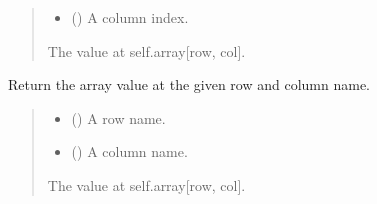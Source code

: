 \documentclass[letterpaper,12pt,english]{sphinxmanual}
\begin{document}
\begin{fulllineitems}
\begin{fulllineitems}
\begin{quote}
\begin{description}
\begin{itemize}
\item {} 
\sphinxAtStartPar
{} () \textendash{} A column index.

\end{itemize}

\sphinxAtStartPar
{} \textendash{} The value at self.array{[}row, col{]}.

\end{description}\end{quote}

\end{fulllineitems}


\begin{fulllineitems}
\label{\detokenize{api/core:cbmpy.CBCommon.StructMatrix.getByName}}
\pysigstartsignatures
\pysiglinewithargsret
{}
{\sphinxparamcomma {}}
{}
\pysigstopsignatures
\sphinxAtStartPar
Return the array value at the given row and column name.
\begin{quote}\begin{description}
\begin{itemize}
\item {} 
\sphinxAtStartPar
{} () \textendash{} A row name.

\item {} 
\sphinxAtStartPar
{} () \textendash{} A column name.

\end{itemize}

\sphinxAtStartPar
{} \textendash{} The value at self.array{[}row, col{]}.

\end{description}\end{quote}


\end{fulllineitems}
\end{fulllineitems}
\end{document}
